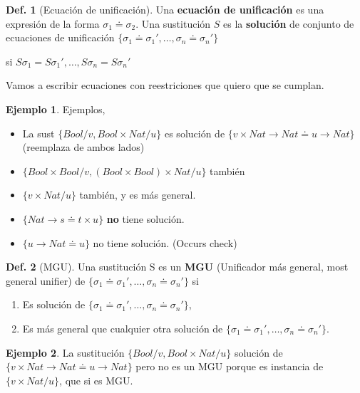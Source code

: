 \documentclass{report}
\theoremstyle{definition} %
\newtheorem{definition}{Def.}[chapter]
\newtheorem{example}{Ejemplo}[chapter]
\newcommand{\tfunc}[2]{#1 \to #2}
\newcommand{\tsust}[1]{S#1} %
\newcommand{\sustfor}[2]{#1/#2} %
\newcommand{\unify}[2]{#1 \doteq #2}
\newcommand{\unifySetD}{\{
    \unify{\sigma_1}{\sigma_1'},
    \dots,
    \unify{\sigma_n}{\sigma_n'} 
\}}
\begin{document}
\begin{definition}[Ecuación de unificación]
    Una \textbf{ecuación de unificación} es una expresión de la forma
    $\unify{\sigma_1}{\sigma_2}$. Una sustitución $S$ es la \textbf{solución} de
   conjunto de ecuaciones de unificación $\unifySetD$
   
    si $\tsust{\sigma_1} = \tsust{\sigma_1'}, \dots, \tsust{\sigma_n} =
    \tsust{\sigma_n'}$
    
    Vamos a escribir ecuaciones con reestriciones que quiero que se cumplan.

    \begin{example} Ejemplos,
        \begin{itemize}
            \item La sust $\{ \sustfor{Bool}{v}, \sustfor{Bool \times Nat}{u}\}$
            es solución de
            $\{
                \unify
                    {\tfunc{v \times Nat}{Nat}}
                    {\tfunc{u}{Nat}}
            \}$ (reemplaza de ambos lados)
            \item $ \{ \sustfor{Bool \times Bool}{v}, \sustfor{(Bool \times
            Bool) \times Nat}{u} \}$ también
            \item $\{ \sustfor{v\times Nat}{u} \}$ también, y es más general.
            \item $\{ \unify{\tfunc{Nat}{s}}{t \times u} \}$ \textbf{no} tiene
            solución.
            \item $\{ \unify{\tfunc{u}{Nat}}{u} \}$ no tiene solución. (Occurs
            check)
        \end{itemize}
    \end{example}
\end{definition}

\begin{definition}[MGU]
Una sustitución S es un \textbf{MGU} (Unificador más general, most general
unifier) de $\unifySetD$ si
\begin{enumerate}
    \item Es solución de $\unifySetD$,
    \item Es más general que cualquier otra solución de $\unifySetD$.
\end{enumerate}
\begin{example}
    La sustitución $\{ \sustfor{Bool}{v}, \sustfor{Bool \times Nat}{u} \}$
    solución de $\{ \unify{\tfunc{v \times Nat}{Nat}}{\tfunc{u}{Nat}} \}$ pero
    no es un MGU porque es instancia de $\{ \sustfor{v \times Nat}{u} \}$, que
    si es MGU.
\end{example}
\end{definition}
\end{document}
